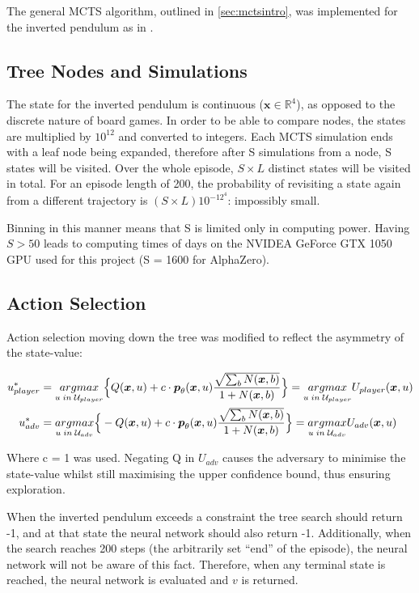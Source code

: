 \documentclass[../main.tex]{subfiles}
\begin{document}
The general MCTS algorithm, outlined in \cref{sec:mctsintro}, was implemented for the inverted pendulum as in .

\subsection{Tree Nodes and Simulations}

The state for the inverted pendulum is continuous ($\boldsymbol{x} \in \mathbb{R}^4$), as opposed to the discrete nature of board games. In order to be able to compare nodes, the states are multiplied by $10^{12}$ and converted to integers. Each MCTS simulation ends with a leaf node being expanded, therefore after S simulations from a node, S states will be visited. Over the whole episode, $S\times L$ distinct states will be visited in total. For an episode length of 200, the probability of revisiting a state again from a different trajectory is $(S \times L)10^{-12^4}$: impossibly small.

Binning in this manner means that S is limited only in computing power. Having $S>50$ leads to computing times of days on the NVIDEA GeForce GTX 1050 GPU used for this project (S = 1600 for AlphaZero).

\subsection{Action Selection}
Action selection moving down the tree was modified to reflect the asymmetry of the state-value:

{
\newcommand{\bx}{\boldsymbol{x}}
\begin{align}
   u^*_{player} & = \underset{u \; in \; \mathcal{U}_{player}}{argmax} \Big{\{} Q(\bx, u) + c \cdot\boldsymbol{p}_\theta (\bx, u)\frac{\sqrt{\sum_b N(\bx, b)}}{1 + N(\bx, b)}\Big{\}} =  \underset{u \; in \; \mathcal{U}_{player}}{argmax} U_{player}(\bx, u) \\
   u^*_{adv} & = \underset{u \; in \; \mathcal{U}_{adv}}{argmax} \Big{\{} -Q(\bx, u) + c \cdot\boldsymbol{p}_\theta (\bx, u)\frac{\sqrt{\sum_b N(\bx, b)}}{1 + N(\bx, b)}\Big{\}} = \underset{u \; in \; \mathcal{U}_{adv}}{argmax} U_{adv}(\bx, u)
   \label{eqn:IPucb}
\end{align}
}

Where c = 1 was used. Negating Q in $U_{adv}$ causes the adversary to minimise the state-value whilst still maximising the upper confidence bound, thus ensuring exploration.

When the inverted pendulum exceeds a constraint the tree search should return -1, and at that state the neural network should also return -1. Additionally, when the search reaches 200 steps (the arbitrarily set ``end'' of the episode), the neural network will not be aware of this fact. Therefore, when any terminal state is reached, the neural network is evaluated and $v$ is returned.
\end{document}
